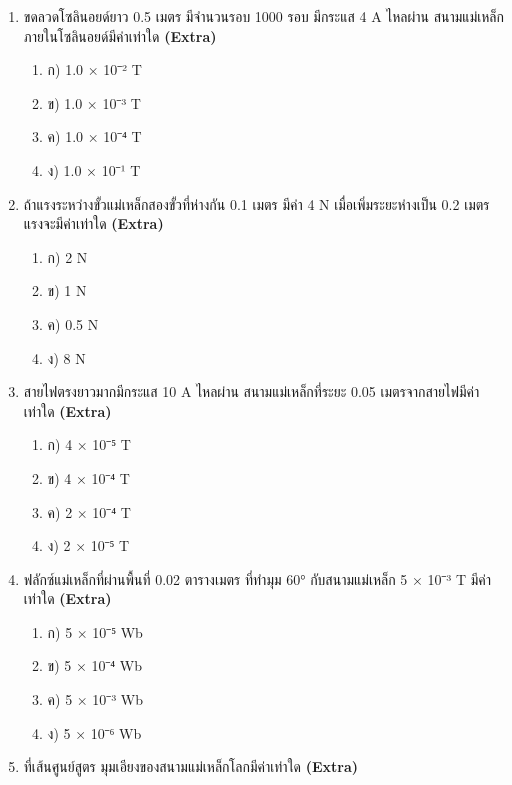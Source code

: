 \documentclass[12pt]{article}
\begin{document}
\begin{enumerate}[label=\arabic*.]
\begin{enumerate}[label=)]
\item ก) 3.14 × 10⁻⁵ T
\item ข) 3.14 × 10⁻⁴ T
\item ค) 3.14 × 10⁻³ T
\item ง) 3.14 × 10⁻⁶ T
\end{enumerate}
\item ขดลวดโซลินอยด์ยาว 0.5 เมตร มีจำนวนรอบ 1000 รอบ มีกระแส 4 A ไหลผ่าน สนามแม่เหล็กภายในโซลินอยด์มีค่าเท่าใด \hfill \textbf{\small (Extra)}
\begin{enumerate}[label=)]
\item ก) 1.0 × 10⁻² T
\item ข) 1.0 × 10⁻³ T
\item ค) 1.0 × 10⁻⁴ T
\item ง) 1.0 × 10⁻¹ T
\end{enumerate}
\item ถ้าแรงระหว่างขั้วแม่เหล็กสองขั้วที่ห่างกัน 0.1 เมตร มีค่า 4 N เมื่อเพิ่มระยะห่างเป็น 0.2 เมตร แรงจะมีค่าเท่าใด \hfill \textbf{\small (Extra)}
\begin{enumerate}[label=)]
\item ก) 2 N
\item ข) 1 N
\item ค) 0.5 N
\item ง) 8 N
\end{enumerate}
\item สายไฟตรงยาวมากมีกระแส 10 A ไหลผ่าน สนามแม่เหล็กที่ระยะ 0.05 เมตรจากสายไฟมีค่าเท่าใด \hfill \textbf{\small (Extra)}
\begin{enumerate}[label=)]
\item ก) 4 × 10⁻⁵ T
\item ข) 4 × 10⁻⁴ T
\item ค) 2 × 10⁻⁴ T
\item ง) 2 × 10⁻⁵ T
\end{enumerate}
\item ฟลักซ์แม่เหล็กที่ผ่านพื้นที่ 0.02 ตารางเมตร ที่ทำมุม 60° กับสนามแม่เหล็ก 5 × 10⁻³ T มีค่าเท่าใด \hfill \textbf{\small (Extra)}
\begin{enumerate}[label=)]
\item ก) 5 × 10⁻⁵ Wb
\item ข) 5 × 10⁻⁴ Wb
\item ค) 5 × 10⁻³ Wb
\item ง) 5 × 10⁻⁶ Wb
\end{enumerate}
\item ที่เส้นศูนย์สูตร มุมเอียงของสนามแม่เหล็กโลกมีค่าเท่าใด \hfill \textbf{\small (Extra)}
\begin{enumerate}[label=)]

\end{enumerate}
\end{enumerate}
\end{document}
